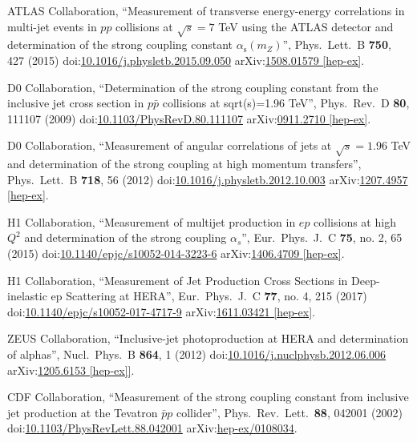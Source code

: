 \begin{thebibliography}{99}
ATLAS Collaboration, ``Measurement of transverse energy-energy correlations in multi-jet events in $pp$ collisions at $\sqrt{s} = 7$ TeV using the ATLAS detector and determination of the strong coupling constant $\alpha_{\mathrm{s}}(m_Z)$'', Phys.\ Lett.\ B {\bf 750}, 427 (2015) doi:\href{http://dx.doi.org/10.1016/j.physletb.2015.09.050}{10.1016/j.physletb.2015.09.050} arXiv:\href{https://arxiv.org/abs/1508.01579}{1508.01579 [hep-ex]}.

D0 Collaboration, ``Determination of the strong coupling constant from the inclusive jet cross section in $p\bar{p}$ collisions at sqrt(s)=1.96 TeV'', Phys.\ Rev.\ D {\bf 80}, 111107 (2009) doi:\href{http://dx.doi.org/10.1103/PhysRevD.80.111107}{10.1103/PhysRevD.80.111107} arXiv:\href{https://arxiv.org/abs/0911.2710}{0911.2710 [hep-ex]}.

D0 Collaboration, ``Measurement of angular correlations of jets at $\sqrt{s}=1.96$ TeV and determination of the strong coupling at high momentum transfers'', Phys.\ Lett.\ B {\bf 718}, 56 (2012) doi:\href{http://dx.doi.org/10.1016/j.physletb.2012.10.003}{10.1016/j.physletb.2012.10.003} arXiv:\href{https://arxiv.org/abs/1207.4957}{1207.4957 [hep-ex]}.

H1 Collaboration, ``Measurement of multijet production in $ep$ collisions at high $Q^2$ and determination of the strong coupling $\alpha_s$'', Eur.\ Phys.\ J.\ C {\bf 75}, no. 2, 65 (2015) doi:\href{http://dx.doi.org/10.1140/epjc/s10052-014-3223-6}{10.1140/epjc/s10052-014-3223-6} arXiv:\href{https://arxiv.org/abs/1406.4709}{1406.4709 [hep-ex]}.

H1 Collaboration, ``Measurement of Jet Production Cross Sections in Deep-inelastic ep Scattering at HERA'', Eur.\ Phys.\ J.\ C {\bf 77}, no. 4, 215 (2017) doi:\href{http://dx.doi.org/10.1140/epjc/s10052-017-4717-9}{10.1140/epjc/s10052-017-4717-9} arXiv:\href{https://arxiv.org/abs/1611.03421}{1611.03421 [hep-ex]}.

ZEUS Collaboration, ``Inclusive-jet photoproduction at HERA and determination of alphas'', Nucl.\ Phys.\ B {\bf 864}, 1 (2012) doi:\href{http://dx.doi.org/10.1016/j.nuclphysb.2012.06.006}{10.1016/j.nuclphysb.2012.06.006} arXiv:\href{https://arxiv.org/abs/1205.6153}{1205.6153 [hep-ex]]}.

CDF Collaboration, ``Measurement of the strong coupling constant from inclusive jet production at the Tevatron $\bar{p}p$ collider'', Phys.\ Rev.\ Lett.\ {\bf 88}, 042001 (2002) doi:\href{http://dx.doi.org/10.1103/PhysRevLett.88.042001}{10.1103/PhysRevLett.88.042001} arXiv:\href{https://arxiv.org/pdf/hep-ex/0108034.pdf}{hep-ex/0108034}.


\end{thebibliography}
